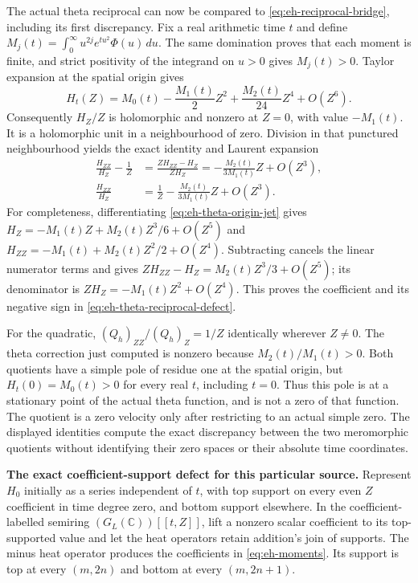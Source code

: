 The actual theta reciprocal can now be compared to
\eqref{eq:eh-reciprocal-bridge}, including its first discrepancy.
Fix a real arithmetic time $t$ and define
$M_j(t)=\int_0^\infty u^{2j}e^{tu^2}\Phi(u)\,du$. The same
domination proves that each moment is finite, and strict positivity
of the integrand on $u>0$ gives $M_j(t)>0$. Taylor expansion at
the spatial origin gives
\begin{equation}
 H_t(Z)=M_0(t)-\frac{M_1(t)}2Z^2
          +\frac{M_2(t)}{24}Z^4+O(Z^6).
 \label{eq:eh-theta-origin-jet}
\end{equation}
Consequently $H_Z/Z$ is holomorphic and nonzero at $Z=0$, with
value $-M_1(t)$. It is a holomorphic unit in a neighbourhood of
zero. Division in that punctured neighbourhood yields the exact
identity and Laurent expansion
\begin{align}
 \frac{H_{ZZ}}{H_Z}-\frac1Z
 &=\frac{ZH_{ZZ}-H_Z}{ZH_Z}
   =-\frac{M_2(t)}{3M_1(t)}Z+O(Z^3),
 \label{eq:eh-theta-reciprocal-defect}\\
 \frac{H_{ZZ}}{H_Z}
 &=\frac1Z-\frac{M_2(t)}{3M_1(t)}Z+O(Z^3).
 \label{eq:eh-theta-reciprocal-expansion}
\end{align}
For completeness, differentiating \eqref{eq:eh-theta-origin-jet}
gives $H_Z=-M_1(t)Z+M_2(t)Z^3/6+O(Z^5)$ and
$H_{ZZ}=-M_1(t)+M_2(t)Z^2/2+O(Z^4)$. Subtracting cancels the
linear numerator terms and gives
$ZH_{ZZ}-H_Z=M_2(t)Z^3/3+O(Z^5)$; its denominator is
$ZH_Z=-M_1(t)Z^2+O(Z^4)$. This proves the coefficient and its
negative sign in \eqref{eq:eh-theta-reciprocal-defect}.

For the quadratic, $(Q_h)_{ZZ}/(Q_h)_Z=1/Z$ identically wherever
$Z\ne0$. The theta correction just computed is nonzero because
$M_2(t)/M_1(t)>0$. Both quotients have a simple pole of residue
one at the spatial origin, but $H_t(0)=M_0(t)>0$ for every real
$t$, including $t=0$. Thus this pole is at a stationary point of
the actual theta function, and is not a zero of that function.
The quotient is a zero velocity only after restricting to an actual
simple zero. The displayed identities compute the exact discrepancy
between the two meromorphic quotients without identifying their
zero spaces or their absolute time coordinates.

\EH\textbf{The exact coefficient-support defect for this particular source.}
Represent $H_0$ initially as a series independent of $t$, with top
support on every even $Z$ coefficient in time degree zero, and bottom
support elsewhere. In the coefficient-labelled semiring
$(G_L(\mathbb C))[[t,Z]]$, lift a nonzero scalar coefficient to its
top-supported value and let the heat operators retain addition's join
of supports. The minus heat operator produces the coefficients in
\eqref{eq:eh-moments}. Its support is top at every $(m,2n)$ and bottom
at every $(m,2n+1)$.

